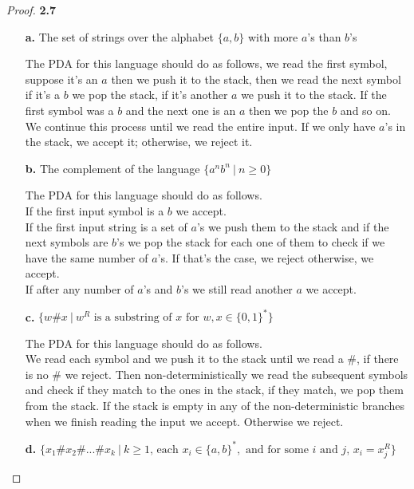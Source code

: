 \documentclass[11pt]{article}
\theoremstyle{definition}
\begin{document}
\cleardoublepage
\begin{proof}{\textbf{2.7}}
\begin{itemize}
    \item [\textbf{a.}]
    The set of strings over the alphabet $\{a,b\}$ with more $a$'s than
    $b$'s

    The PDA for this language should do as follows, we read the first symbol,
    suppose it's an $a$ then we push it to the stack, then we read the next
    symbol if it's a $b$ we pop the stack, if it's another $a$ we push it
    to the stack. If the first symbol was a $b$ and the next one is an $a$
    then we pop the $b$ and so on. We continue this process until we read the
    entire input. If we only have $a$'s in the stack, we accept it; otherwise,
    we reject it.

    \item [\textbf{b.}]
    The complement of the language $\{a^nb^n~|~n\geq 0\}$

    The PDA for this language should do as follows.\\
    If the first input symbol is a $b$ we accept.\\
    If the first input string is a set of $a$'s we push them to the stack
    and if the next symbols are $b$'s we pop the stack for each one of them
    to check if we have the same number of $a$'s. If that's the case, we reject
    otherwise, we accept.\\
    If after any number of $a$'s and $b$'s we still read another $a$ we accept.

    \item [\textbf{c.}]
    $\{w \# x~|~ w^R \text{ is a substring of $x$ for $w$}, x\in \{0,1\}^*\}$

    The PDA for this language should do as follows.\\
    We read each symbol and we push it to the stack until we read a $\#$,
    if there is no $\#$ we reject. Then non-deterministically we read the
    subsequent symbols and check if they match to the ones in the stack,
    if they match, we pop them from the stack. If the stack is empty in any of
    the non-deterministic branches when we finish reading the input we accept.
    Otherwise we reject.    

    \item [\textbf{d.}]
    $\{x_1 \# x_2\#...\# x_k ~|~ k \geq 1 \text{, each }x_i \in \{a,b\}^*,
    \text{ and for some $i$ and $j$, }x_i = x_j^R\}$


\end{itemize}
\end{proof}
\end{document}

